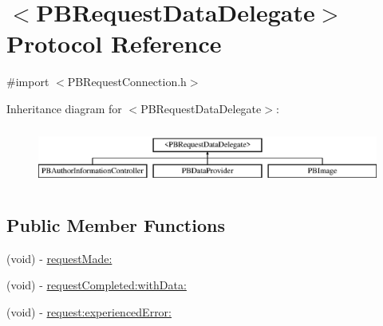 \hypertarget{protocol_p_b_request_data_delegate-p}{
\section{$<$PBRequestDataDelegate$>$ Protocol Reference}
\label{protocol_p_b_request_data_delegate-p}
}


{\ttfamily \#import $<$PBRequestConnection.h$>$}

Inheritance diagram for $<$PBRequestDataDelegate$>$:\begin{figure}[H]
\begin{center}
\leavevmode
\includegraphics[height=1.94444cm]{protocol_p_b_request_data_delegate-p}
\end{center}
\end{figure}
\subsection*{Public Member Functions}
\begin{DoxyCompactItemize}
\item 
(void) -\/ \hyperlink{protocol_p_b_request_data_delegate-p_a611a767feb6d909f711af3edbfbcac71}{requestMade:}
\item 
(void) -\/ \hyperlink{protocol_p_b_request_data_delegate-p_a8c470348d27d13f5d8784b65c8989e95}{requestCompleted:withData:}
\item 
(void) -\/ \hyperlink{protocol_p_b_request_data_delegate-p_ac1ed08e62e6d22f177e90a8ffa2529e7}{request:experiencedError:}
\end{DoxyCompactItemize}


